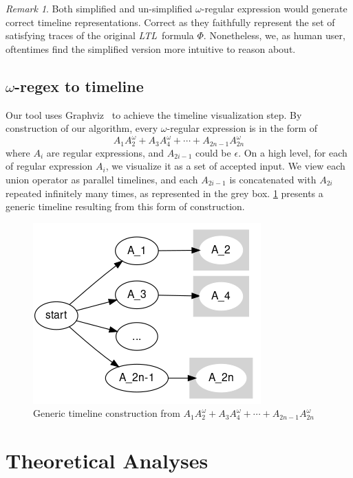 \documentclass[preprint,12pt]{elsarticle}
\theoremstyle{definition}
\theoremstyle{remark}
\newtheorem{remark}{Remark}[section]
\newcommand{\ltl}{\textit{LTL}}
\begin{document}
\begin{remark}
    Both simplified and un-simplified $\omega$-regular expression would generate correct timeline representations. Correct as they faithfully represent the set of satisfying traces of the original \ltl\ formula $\Phi$. Nonetheless, we, as human user, oftentimes find the simplified version more intuitive to reason about.
\end{remark}

\subsection{$\omega$-regex to timeline} \label{regex2timeline}
Our tool uses Graphviz~\cite{Ellson2001GraphvizO} to achieve the timeline visualization step. By construction of our algorithm, every $\omega$-regular expression is in the form of
\[
    A_1A_2^{\omega} + A_3A_4^{\omega} + \cdots + A_{2n-1}A_{2n}^{\omega}
\]
where $A_i$ are regular expressions, and $A_{2i-1}$ could be $\epsilon$. On a high level, for each of regular expression $A_i$, we visualize it as a set of accepted input. We view each union operator as parallel timelines, and each $A_{2i-1}$ is concatenated with $A_{2i}$ repeated infinitely many times, as represented in the grey box. \cref{fig:timeline} presents a generic timeline resulting from this form of construction.
\begin{figure}[h!]
    \centering
    \includegraphics[scale=0.5]{img/timeline.png}
    \caption{Generic timeline construction from $A_1A_2^{\omega} + A_3A_4^{\omega} + \cdots + A_{2n-1}A_{2n}^{\omega}$}
    \label{fig:timeline}
\end{figure}

\section{Theoretical Analyses}
\end{document}
